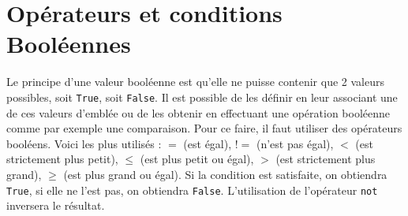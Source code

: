 \section{Opérateurs et conditions Booléennes}
Le principe d'une valeur booléenne est qu'elle 
ne puisse contenir que 2 valeurs possibles, soit 
\lstinline{True}, soit \lstinline{False}. Il est possible 
de les définir en leur associant une 
de ces valeurs d'emblée ou de les obtenir 
en effectuant une opération booléenne comme par exemple une comparaison. 
Pour ce faire, il faut utiliser des opérateurs booléens. 
Voici les plus utilisés : $=$ (est égal), $!=$ (n'est pas égal), 
$<$ (est strictement plus petit), 
$\leq$ (est plus petit ou égal), $>$ (est strictement plus grand),
 $\geq$ (est plus grand ou égal). Si la condition est satisfaite, on obtiendra \lstinline{True}, si elle ne l'est pas, on obtiendra \lstinline{False}. L'utilisation de l'opérateur \lstinline{not} inversera le résultat.\\

